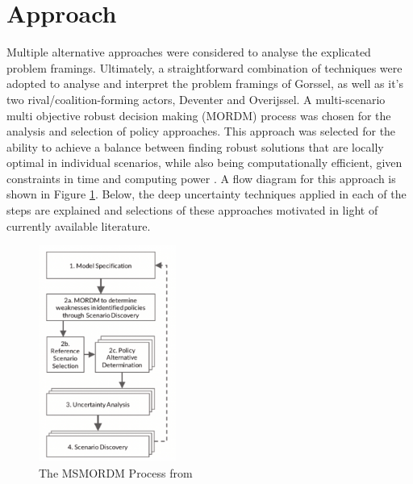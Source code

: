 \section{Approach}
\label{s:approach}


Multiple alternative approaches were considered to analyse the explicated problem framings. Ultimately, a straightforward combination of techniques were adopted to analyse and interpret the problem framings of Gorssel, as well as it's two rival/coalition-forming actors, Deventer and Overijssel. A multi-scenario multi objective robust decision making (MORDM) process was chosen for the analysis and selection of policy approaches. This approach was selected for the ability to achieve a balance between finding robust solutions that are locally optimal in individual scenarios, while also being computationally efficient, given constraints in time and computing power \parencite{bartholomew_considering_2020}. A flow diagram for this approach is shown in Figure \ref{fig:msmordm}. Below, the deep uncertainty techniques applied in each of the steps are explained and selections of these approaches motivated in light of currently available literature.

\begin{figure}[h]
    \centering
    \includegraphics[width=0.4\textwidth]{report/figures/msmordm.png}
    \caption{The MSMORDM Process from \citeauthor{bartholomew_considering_2020}}
    \label{fig:msmordm}
\end{figure}

